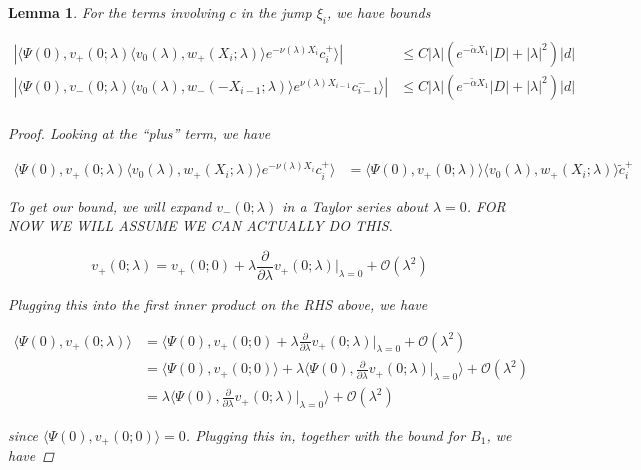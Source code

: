 \documentclass[12pt]{article}
\newtheorem{lemma}{Lemma}
\begin{document}
\begin{lemma}\label{jumpc}
For the terms involving $c$ in the jump $\xi_i$, we have bounds

\begin{align*}
|\langle \Psi(0), v_+(0; \lambda) \langle v_0(\lambda), w_+(X_i; \lambda) \rangle e^{-\nu(\lambda)X_i} c_i^+ \rangle| &\leq C |\lambda| ( e^{-\tilde{\alpha} X_1} |D| + |\lambda|^2 )|d| \\
|\langle \Psi(0), v_-(0; \lambda) \langle v_0(\lambda), w_-(-X_{i-1}; \lambda) \rangle e^{\nu(\lambda)X_{i-1}} c_{i-1}^- \rangle | &\leq C |\lambda| ( e^{-\tilde{\alpha} X_1} |D| + |\lambda|^2 )|d| \\
\end{align*}

\begin{proof}
Looking at the ``plus'' term, we have

\begin{align*}
\langle \Psi(0), v_+(0; \lambda) \langle v_0(\lambda), w_+(X_i; \lambda) \rangle e^{-\nu(\lambda)X_i} c_i^+ \rangle &= \langle \Psi(0), v_+(0; \lambda) \rangle \langle v_0(\lambda), w_+(X_i; \lambda) \rangle \tilde{c}_i^+
\end{align*}

To get our bound, we will expand $v_-(0; \lambda)$ in a Taylor series about $\lambda = 0$. FOR NOW WE WILL ASSUME WE CAN ACTUALLY DO THIS.

\[
v_+(0; \lambda) = v_+(0; 0) + \lambda \frac{\partial}{\partial \lambda}v_+(0; \lambda)\Big|_{\lambda = 0} + \mathcal{O}(\lambda^2)
\]

Plugging this into the first inner product on the RHS above, we have

\begin{align*}
\langle \Psi(0), v_+(0; \lambda) \rangle &=
\langle \Psi(0), v_+(0; 0) + \lambda \frac{\partial}{\partial \lambda}v_+(0; \lambda)\Big|_{\lambda = 0} + \mathcal{O}(\lambda^2) \\
&= \langle \Psi(0), v_+(0; 0) \rangle + \lambda \langle \Psi(0), \frac{\partial}{\partial \lambda}v_+(0; \lambda)\Big|_{\lambda = 0} \rangle + \mathcal{O}(\lambda^2)\\
&= \lambda \langle \Psi(0), \frac{\partial}{\partial \lambda}v_+(0; \lambda)\Big|_{\lambda = 0} \rangle + \mathcal{O}(\lambda^2)
\end{align*}

since $\langle \Psi(0), v_+(0; 0) \rangle = 0$. Plugging this in, together with the bound for $B_1$, we have


\end{proof}
\end{lemma}
\end{document}

